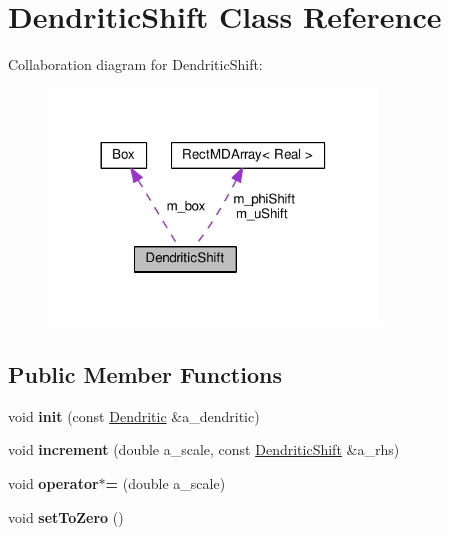 \hypertarget{classDendriticShift}{}\section{Dendritic\+Shift Class Reference}
\label{classDendriticShift}


Collaboration diagram for Dendritic\+Shift\+:
\nopagebreak
\begin{figure}[H]
\begin{center}
\leavevmode
\includegraphics[width=248pt]{classDendriticShift__coll__graph}
\end{center}
\end{figure}
\subsection*{Public Member Functions}
\begin{DoxyCompactItemize}
\item 
\hypertarget{classDendriticShift_adee89364f91a569e90602b6c40ecd9f0}{}void {\bfseries init} (const \hyperlink{classDendritic}{Dendritic} \&a\+\_\+dendritic)\label{classDendriticShift_adee89364f91a569e90602b6c40ecd9f0}

\item 
\hypertarget{classDendriticShift_a4eeae0e689cf4fa7c5cdacfd2420d260}{}void {\bfseries increment} (double a\+\_\+scale, const \hyperlink{classDendriticShift}{Dendritic\+Shift} \&a\+\_\+rhs)\label{classDendriticShift_a4eeae0e689cf4fa7c5cdacfd2420d260}

\item 
\hypertarget{classDendriticShift_ab97d5c358ddafa3ff7fb6d13cdc3521a}{}void {\bfseries operator$\ast$=} (double a\+\_\+scale)\label{classDendriticShift_ab97d5c358ddafa3ff7fb6d13cdc3521a}

\item 
\hypertarget{classDendriticShift_aa195e2e73dffff676d52bcf39c367cdb}{}void {\bfseries set\+To\+Zero} ()\label{classDendriticShift_aa195e2e73dffff676d52bcf39c367cdb}

\end{DoxyCompactItemize}
